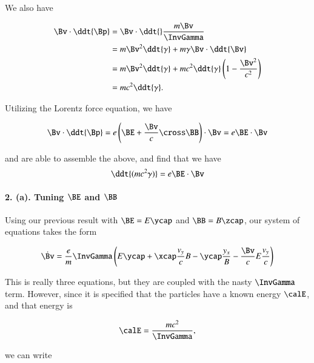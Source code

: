 {We also have

\begin{equation}\label{eqn:relElectroDynProblemSet2:1170}
\begin{aligned}
\Bv \cdot \ddt{\Bp}
&= \Bv \cdot \ddt{} \frac{m \Bv}{\InvGamma} \\
&= m\Bv^2 \ddt{\gamma} + m \gamma \Bv \cdot \ddt{\Bv} \\
&= m\Bv^2 \ddt{\gamma} + m c^2 \ddt{\gamma} \left( 1 - \frac{\Bv^2}{c^2} \right) \\
&= m c^2 \ddt{\gamma}.
\end{aligned}
\end{equation}

Utilizing the Lorentz force equation, we have

\begin{equation}\label{eqn:relElectroDynProblemSet2:250}
\Bv \cdot \ddt{\Bp} = e \left( \BE + \frac{\Bv}{c} \cross \BB \right) \cdot \Bv = e \BE \cdot \Bv
\end{equation}

and are able to assemble the above, and find that we have
\begin{equation}\label{eqn:relElectroDynProblemSet2:270}
\ddt{(m c^2 \gamma)} = e \BE \cdot \Bv
\end{equation}

\paragraph{2. (a). Tuning \texorpdfstring{\(\BE\) and \(\BB\)}{E and B}}

Using our previous result with \(\BE = E \ycap\) and \(\BB = B \zcap\), our system of equations takes the form

\begin{equation}\label{eqn:relElectroDynProblemSet2:290}
\dot{\Bv} = \frac{e}{m} \InvGamma \left( E \ycap + \xcap \frac{v_y}{c} B - \ycap \frac{y_x} B - \frac{\Bv}{c} E \frac{v_y}{c} \right)
\end{equation}

This is really three equations, but they are coupled with the nasty \(\InvGamma\) term.  However, since it is specified that the particles have a known energy \(\calE\), and that energy is

\begin{equation}\label{eqn:relElectroDynProblemSet2:310}
\calE = \frac{ m c^2 }{\InvGamma},
\end{equation}

we can write

}
